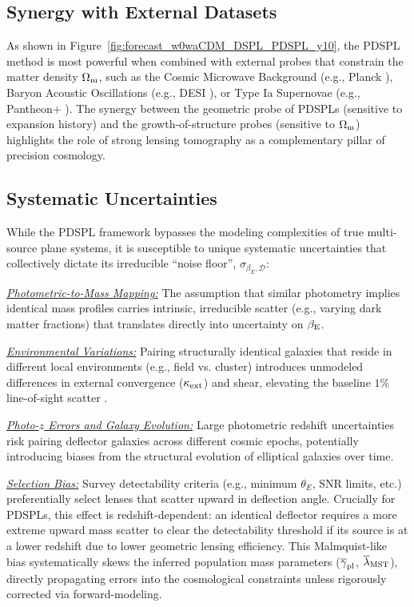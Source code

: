 \documentclass[a4paper,11pt]{article}
\begin{document}
\subsection{Synergy with External Datasets}
As shown in Figure~\ref{fig:forecast_w0waCDM_DSPL_PDSPL_y10}, the PDSPL method is most powerful when combined with external probes that constrain the matter density $\Omega_{\rm m}$, such as the Cosmic Microwave Background (e.g., Planck \cite{Planck:2020}), Baryon Acoustic Oscillations (e.g., DESI \citep{DESI:BAO:2025}), or Type Ia Supernovae (e.g., Pantheon+ \citep{Pantheon+:Brout:2022}). The synergy between the geometric probe of PDSPLs (sensitive to expansion history) and the growth-of-structure probes (sensitive to $\Omega_{\rm m}$) highlights the role of strong lensing tomography as a complementary pillar of precision cosmology.

\subsection{Systematic Uncertainties}
While the PDSPL framework bypasses the modeling complexities of true multi-source plane systems, it is susceptible to unique systematic uncertainties that collectively dictate its irreducible ``noise floor'', $\sigma_{\beta_E, \mathcal{D}}$:

\noindent \underline{\textit{Photometric-to-Mass Mapping:}} The assumption that similar photometry implies identical mass profiles carries intrinsic, irreducible scatter (e.g., varying dark matter fractions) that translates directly into uncertainty on $\beta_{\rm E}$.

\noindent \underline{\textit{Environmental Variations:}} Pairing structurally identical galaxies that reside in different local environments (e.g., field vs. cluster) introduces unmodeled differences in external convergence ($\kappa_{\rm ext}$) and shear, elevating the baseline $1\%$ line-of-sight scatter \cite{Johnson:2025}.

\noindent \underline{\textit{Photo-$z$ Errors and Galaxy Evolution:}} Large photometric redshift uncertainties risk pairing deflector galaxies across different cosmic epochs, potentially introducing biases from the structural evolution of elliptical galaxies over time.

\noindent \underline{\textit{Selection Bias:}} Survey detectability criteria (e.g., minimum $\theta_E$, SNR limits, etc.)~\cite{Collett:2015} preferentially select lenses that scatter upward in deflection angle. Crucially for PDSPLs, this effect is redshift-dependent: an identical deflector requires a more extreme upward mass scatter to clear the detectability threshold if its source is at a lower redshift due to lower geometric lensing efficiency. This Malmquist-like bias systematically skews the inferred population mass parameters ($\overline{\gamma}_{\rm pl}$, $\overline{\lambda}_{\rm MST}$), directly propagating errors into the cosmological constraints unless rigorously corrected via forward-modeling.
\end{document}
